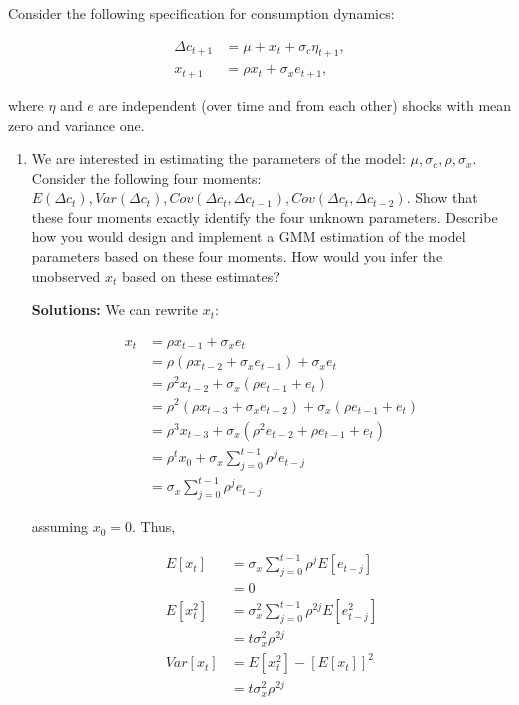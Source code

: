 \documentclass{article}
\begin{document}
Consider the following specification for consumption dynamics:

\begin{align*}
\Delta c_{t+1} &= \mu + x_t + \sigma_c \eta_{t+1},\\
x_{t+1} &= \rho x_t + \sigma_x e_{t+1},
\end{align*}

where $\eta$ and $e$ are independent (over time and from each other) shocks with mean zero and variance one.

\begin{enumerate}

\item We are interested in estimating the parameters of the model: $\mu, \sigma_c, \rho, \sigma_x$. Consider the following four moments: $E(\Delta c_t), Var(\Delta c_t), Cov(\Delta c_t, \Delta c_{t-1}), Cov(\Delta c_t, \Delta c_{t-2})$. Show that these four moments exactly identify the four unknown parameters. Describe how you would design and implement a GMM estimation of the model parameters based on these four moments. How would you infer the unobserved $x_t$ based on these estimates?

\bigskip

\textbf{Solutions:} We can rewrite $x_t$:

\begin{align*}
x_{t}
&= \rho x_{t-1} + \sigma_x e_{t} \\
&= \rho (\rho x_{t-2} + \sigma_x e_{t-1}) + \sigma_x e_{t} \\
&= \rho^2x_{t-2} + \sigma_x (\rho e_{t-1} + e_t)\\
&= \rho^2(\rho x_{t-3} + \sigma_x e_{t-2}) + \sigma_x (\rho e_{t-1} + e_t)\\
&= \rho^3 x_{t-3} + \sigma_x (\rho^2 e_{t-2} + \rho e_{t-1} + e_t)\\
&= \rho^t x_0 + \sigma_x \sum_{j=0}^{t-1} \rho^j e_{t-j}\\
&= \sigma_x \sum_{j=0}^{t-1} \rho^j e_{t-j}
\end{align*}

assuming $x_0 = 0$.  Thus, 

\begin{align*}
E[x_t] 
&= \sigma_x \sum_{j=0}^{t-1} \rho^j E[e_{t-j}] \\
&= 0\\
E[x_t^2] 
&= \sigma_x^2 \sum_{j=0}^{t-1} \rho^{2j} E[e_{t-j}^2]\\
&= t\sigma_x^2 \rho^{2j}\\
Var[x_t] 
&= E[x_t^2] - [E[x_t]]^2 \\
&= t\sigma_x^2 \rho^{2j}
\end{align*} 


\end{enumerate}
\end{document}
